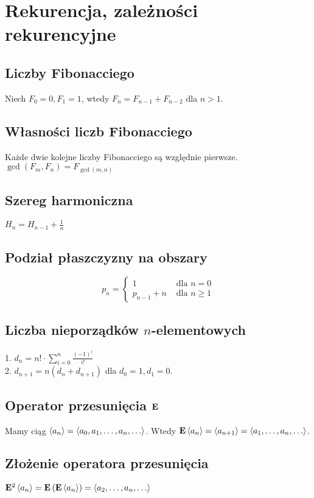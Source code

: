 \section{Rekurencja, zależności rekurencyjne}

\subsection*{Liczby Fibonacciego}
Niech $F_0 = 0, F_1 = 1$, wtedy $F_n = F_{n-1} + F_{n-2}$ dla $n > 1$. 

\subsection*{Własności liczb Fibonacciego}
Każde dwie kolejne liczby Fibonacciego są względnie pierwsze. \\
$\gcd(F_m, F_n) = F_{\gcd(m, n)}$

\subsection*{Szereg harmoniczna}
$H_n = H_{n-1} + \frac{1}{n}$

\subsection*{Podział płaszczyzny na obszary}
$$
p_n =
\begin{cases}
    1 &\text{ dla } n = 0 \\
    p_{n-1} + n &\text{ dla } n \geq 1 
\end{cases}
$$

\subsection*{Liczba nieporządków $n$-elementowych}
1. $d_n = n! \cdot \sum\limits_{i=0}^{n} \frac{(-1)^i}{i!}$ \\
2. $d_{n+1} = n(d_n + d_{n+1})$ dla $d_0 = 1, d_1 = 0$.

\subsection*{Operator przesunięcia $\mathbf{E}$}
Mamy ciąg $\left\langle a_n \right\rangle = \left\langle a_0, a_1, \ldots, a_n, \ldots \right\rangle$. Wtedy
$\mathbf{E} \left\langle a_n \right\rangle = \left\langle a_{n+1} \right\rangle = \left\langle a_1, \ldots, a_n, \ldots \right\rangle$.

\subsection*{Złożenie operatora przesunięcia}
$\mathbf{E}^2 \left\langle a_n \right\rangle = \mathbf{E} \left( \mathbf{E} \left\langle a_n \right\rangle \right)
= \left\langle a_2, \ldots, a_n, \ldots \right\rangle$

